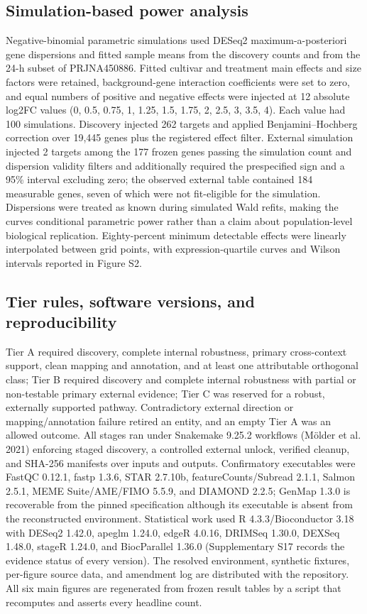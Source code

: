 \documentclass[12pt,letterpaper]{article}
\begin{document}
\subsection*{Simulation-based power analysis}

Negative-binomial parametric simulations used DESeq2 maximum-a-posteriori gene dispersions and fitted sample means from the discovery counts and from the 24-h subset of PRJNA450886. Fitted cultivar and treatment main effects and size factors were retained, background-gene interaction coefficients were set to zero, and equal numbers of positive and negative effects were injected at 12 absolute log2FC values (0, 0.5, 0.75, 1, 1.25, 1.5, 1.75, 2, 2.5, 3, 3.5, 4). Each value had 100 simulations. Discovery injected 262 targets and applied Benjamini–Hochberg correction over 19,445 genes plus the registered effect filter. External simulation injected 2 targets among the 177 frozen genes passing the simulation count and dispersion validity filters and additionally required the prespecified sign and a 95\% interval excluding zero; the observed external table contained 184 measurable genes, seven of which were not fit-eligible for the simulation. Dispersions were treated as known during simulated Wald refits, making the curves conditional parametric power rather than a claim about population-level biological replication. Eighty-percent minimum detectable effects were linearly interpolated between grid points, with expression-quartile curves and Wilson intervals reported in Figure S2.

\subsection*{Tier rules, software versions, and reproducibility}

Tier A required discovery, complete internal robustness, primary cross-context support, clean mapping and annotation, and at least one attributable orthogonal class; Tier B required discovery and complete internal robustness with partial or non-testable primary external evidence; Tier C was reserved for a robust, externally supported pathway. Contradictory external direction or mapping/annotation failure retired an entity, and an empty Tier A was an allowed outcome. All stages ran under Snakemake 9.25.2 workflows (Mölder et al. 2021) enforcing staged discovery, a controlled external unlock, verified cleanup, and SHA-256 manifests over inputs and outputs. Confirmatory executables were FastQC 0.12.1, fastp 1.3.6, STAR 2.7.10b, featureCounts/Subread 2.1.1, Salmon 2.5.1, MEME Suite/AME/FIMO 5.5.9, and DIAMOND 2.2.5; GenMap 1.3.0 is recoverable from the pinned specification although its executable is absent from the reconstructed environment. Statistical work used R 4.3.3/Bioconductor 3.18 with DESeq2 1.42.0, apeglm 1.24.0, edgeR 4.0.16, DRIMSeq 1.30.0, DEXSeq 1.48.0, stageR 1.24.0, and BiocParallel 1.36.0 (Supplementary S17 records the evidence status of every version). The resolved environment, synthetic fixtures, per-figure source data, and amendment log are distributed with the repository. All six main figures are regenerated from frozen result tables by a script that recomputes and asserts every headline count.
\end{document}
